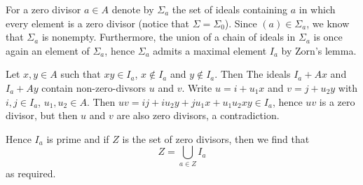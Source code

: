For a zero divisor $a \in A$ denote by  $\Sigma_a$ the set of ideals containing
$a$ in which every element is a zero divisor (notice that $\Sigma = \Sigma_0$). Since $(a) \in \Sigma_a$, we know
that $\Sigma_a$ is nonempty. Furthermore, the union of a chain of ideals in
$\Sigma_a$ is once again an element of $\Sigma_a$, hence $\Sigma_a$ admits
a maximal element $I_a$ by Zorn's lemma.

Let $x, y \in A$ such that $xy \in I_a$, $x\notin I_a$ and $y\notin I_a$. Then
The ideals $I_a + Ax$ and $I_a + Ay$ contain non-zero-divsors $u$ and $v$. Write
$u = i + u_1x$ and $v = j + u_2y$ with $i, j \in I_a$, $u_1, u_2 \in A$. Then
$uv = ij + iu_2y + ju_1x + u_1u_2xy \in I_a$, hence $uv$ is a zero divisor, but
then $u$ and $v$ are also zero divisors, a contradiction.

Hence $I_a$ is prime and if $Z$ is the set of zero divisors, then we find that
\[ Z = \bigcup_{a \in Z} I_a \]
as required.
